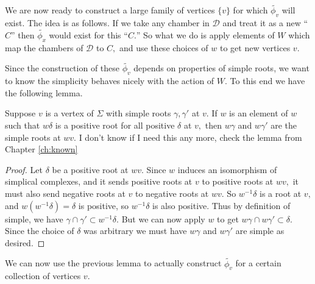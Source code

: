 \documentclass[class=book, crop=false,12 pt]{standalone}
\begin{document}
We are now ready to construct a large family of vertices $\{v\}$ for which $\tilde{\phi_v}$ will exist. The idea is as follows. If we take any chamber in $\mathcal{D}$ and treat it as a new ``$C$'' then $\tilde{\phi_x}$ would exist for this ``$C.$'' So what we do is apply elements of $W$ which map the chambers of $\mathcal{D}$ to $C,$ and use these choices of $w$ to get new vertices $v.$

Since the construction of these $\tilde{\phi_v}$ depends on properties of simple roots, we want to know the simplicity behaves nicely with the action of $W.$ To this end we have the following lemma.

\begin{lemma}
	Suppose $v$ is a vertex of $\Sigma$ with simple roots $\gamma,\gamma'$ at $v.$ If $w$ is an element of $w$ such that $w\delta$ is a positive root for all positive $\delta$ at $v,$ then $w\gamma$ and $w\gamma'$ are the simple roots at $wv.$ \label{preservesimple}
	\Huge I don't know if I need this any more, check the lemma from Chapter \ref{ch:known} \normalsize
\end{lemma}
\begin{proof}
	Let $\delta$ be a positive root at $wv.$ Since $w$ induces an isomorphism of simplical complexes, and it sends positive roots at $v$ to positive roots at $wv,$ it must also send negative roots at $v$ to negative roots at $wv.$ So $w^{-1}\delta$ is a root at $v,$ and $w(w^{-1}\delta)=\delta$ is positive, so $w^{-1}\delta$ is also positive. Thus by definition of simple, we have $\gamma \cap \gamma'\subset w^{-1}\delta.$ But we can now apply $w$ to get $w\gamma \cap w\gamma' \subset \delta.$ Since the choice of $\delta$ was arbitrary we must have $w\gamma$ and $w\gamma'$ are simple as desired.
\end{proof}

We can now use the previous lemma to actually construct $\tilde{\phi_v}$ for a certain collection of vertices $v.$
\end{document}
